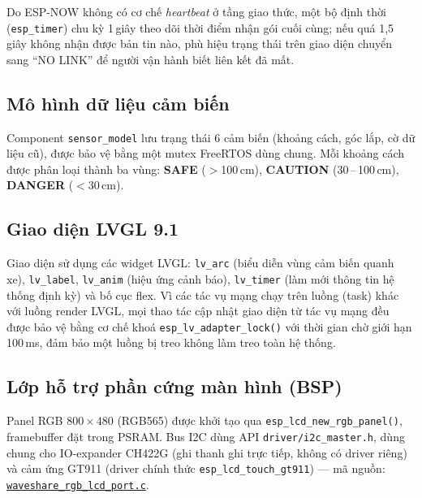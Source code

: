 \documentclass[a4paper,12pt]{article}
\newcommand{\code}[1]{\texttt{#1}}
\begin{document}
Do ESP-NOW không có cơ chế \emph{heartbeat} ở tầng giao thức, một bộ định thời (\code{esp\_timer}) chu kỳ 1\,giây theo dõi thời điểm nhận gói cuối cùng; nếu quá 1{,}5\,giây không nhận được bản tin nào, phù hiệu trạng thái trên giao diện chuyển sang ``NO LINK'' để người vận hành biết liên kết đã mất.

\subsection{Mô hình dữ liệu cảm biến}

Component \code{sensor\_model} lưu trạng thái 6 cảm biến (khoảng cách, góc lắp, cờ dữ liệu cũ), được bảo vệ bằng một mutex FreeRTOS dùng chung. Mỗi khoảng cách được phân loại thành ba vùng: \textbf{SAFE} ($>$100\,cm), \textbf{CAUTION} (30\,--\,100\,cm), \textbf{DANGER} ($<$30\,cm).

\subsection{Giao diện LVGL 9.1}

Giao diện sử dụng các widget LVGL: \code{lv\_arc} (biểu diễn vùng cảm biến quanh xe), \code{lv\_label}, \code{lv\_anim} (hiệu ứng cảnh báo), \code{lv\_timer} (làm mới thông tin hệ thống định kỳ) và bố cục flex. Vì các tác vụ mạng chạy trên luồng (task) khác với luồng render LVGL, mọi thao tác cập nhật giao diện từ tác vụ mạng đều được bảo vệ bằng cơ chế khoá \code{esp\_lv\_adapter\_lock()} với thời gian chờ giới hạn 100\,ms, đảm bảo một luồng bị treo không làm treo toàn hệ thống.

\subsection{Lớp hỗ trợ phần cứng màn hình (BSP)}

Panel RGB $800\times480$ (RGB565) được khởi tạo qua \code{esp\_lcd\_new\_rgb\_panel()}, framebuffer đặt trong PSRAM. Bus I2C dùng API \code{driver/i2c\_master.h}, dùng chung cho IO-expander CH422G (ghi thanh ghi trực tiếp, không có driver riêng) và cảm ứng GT911 (driver chính thức \code{esp\_lcd\_touch\_gt911}) — mã nguồn: \href{https://github.com/YdtTran/supersonic-warning-system/blob/main/firmware/waveshare-screen/src/bsp/waveshare_rgb_lcd_port.c}{\code{waveshare\_rgb\_lcd\_port.c}}.
\end{document}
